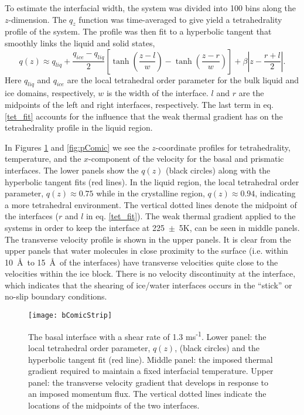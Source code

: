 \documentclass[11pt]{article}
\begin{document}
\begin{doublespace}
To estimate the interfacial width, the system was divided into 100
bins along the $z$-dimension.  The $q_{z}$ function was time-averaged
to give yield a tetrahedrality profile of the system. The profile was
then fit to a hyperbolic tangent that smoothly links the liquid and
solid states,
\begin{equation}\label{tet_fit}
q(z) \approx
q_{liq}+\frac{q_{ice}-q_{liq}}{2}\left[\tanh\left(\frac{z-l}{w}\right)-\tanh\left(\frac{z-r}{w}\right)\right]+\beta\left|z-
\frac{r+l}{2}\right|.
\end{equation}
Here $q_{liq}$ and $q_{ice}$ are the local tetrahedral order parameter
for the bulk liquid and ice domains, respectively, $w$ is the width of
the interface.  $l$ and $r$ are the midpoints of the left and right
interfaces, respectively.  The last term in eq. \eqref{tet_fit}
accounts for the influence that the weak thermal gradient has on the
tetrahedrality profile in the liquid region. 

In Figures \ref{fig:bComic} and \ref{fig:pComic} we see the
$z$-coordinate profiles for tetrahedrality, temperature, and the
$x$-component of the velocity for the basal and prismatic interfaces.
The lower panels show the $q(z)$ (black circles) along with the
hyperbolic tangent fits (red lines). In the liquid region, the local
tetrahedral order parameter, $q(z) \approx 0.75$ while in the
crystalline region, $q(z) \approx 0.94$, indicating a more tetrahedral
environment.  The vertical dotted lines denote the midpoint of the
interfaces ($r$ and $l$ in eq. \eqref{tet_fit}). The weak thermal
gradient applied to the systems in order to keep the interface at
225~$\pm$~5K, can be seen in middle panels.  The transverse velocity
profile is shown in the upper panels.  It is clear from the upper
panels that water molecules in close proximity to the surface (i.e.
within 10~\AA\ to 15~\AA~of the interfaces) have transverse velocities
quite close to the velocities within the ice block.  There is no
velocity discontinuity at the interface, which indicates that the
shearing of ice/water interfaces occurs in the ``stick'' or no-slip
boundary conditions.

\begin{figure}
\texttt{[image: bComicStrip]}
\caption{\label{fig:bComic} The basal interface with a shear rate of
  1.3 ms\textsuperscript{-1}.  Lower panel: the local tetrahedral order parameter, $q(z)$,
  (black circles) and the hyperbolic tangent fit (red line).  Middle
  panel: the imposed thermal gradient required to maintain a fixed
  interfacial temperature.  Upper panel: the transverse velocity
  gradient that develops in response to an imposed momentum flux.  The
  vertical dotted lines indicate the locations of the midpoints of the
  two interfaces.}
\end{figure}


\end{doublespace}
\end{document}
